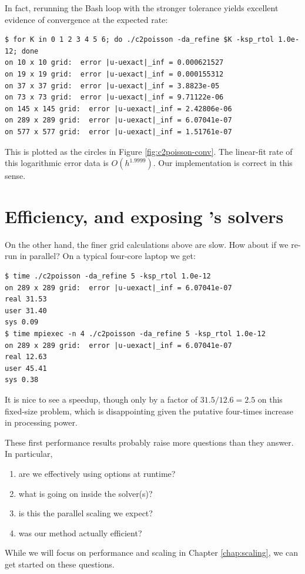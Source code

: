 In fact, rerunning the Bash loop with the stronger tolerance yields excellent evidence of convergence at the expected rate:
\begin{Verbatim}[fontsize=\small]
$ for K in 0 1 2 3 4 5 6; do ./c2poisson -da_refine $K -ksp_rtol 1.0e-12; done
on 10 x 10 grid:  error |u-uexact|_inf = 0.000621527
on 19 x 19 grid:  error |u-uexact|_inf = 0.000155312
on 37 x 37 grid:  error |u-uexact|_inf = 3.8823e-05
on 73 x 73 grid:  error |u-uexact|_inf = 9.71122e-06
on 145 x 145 grid:  error |u-uexact|_inf = 2.42806e-06
on 289 x 289 grid:  error |u-uexact|_inf = 6.07041e-07
on 577 x 577 grid:  error |u-uexact|_inf = 1.51761e-07
\end{Verbatim}
This is plotted as the circles in Figure \ref{fig:c2poisson-conv}.  The linear-fit rate of this logarithmic error data is $O(h^{1.9999})$.  Our implementation is correct in this sense.


\section{Efficiency, and exposing \PETSc's solvers}

On the other hand, the finer grid calculations above are slow.  How about if we re-run in parallel?  On a typical four-core laptop we get:
\begin{Verbatim}[fontsize=\small]
$ time ./c2poisson -da_refine 5 -ksp_rtol 1.0e-12
on 289 x 289 grid:  error |u-uexact|_inf = 6.07041e-07
real 31.53
user 31.40
sys 0.09
$ time mpiexec -n 4 ./c2poisson -da_refine 5 -ksp_rtol 1.0e-12
on 289 x 289 grid:  error |u-uexact|_inf = 6.07041e-07
real 12.63
user 45.41
sys 0.38
\end{Verbatim}
It is nice to see a speedup, though only by a factor of $31.5/12.6 = 2.5$ on this fixed-size problem, which is disappointing given the putative four-times increase in processing power.

These first performance results probably raise more questions than they answer.  In particular,
\renewcommand{\labelenumi}{\roman{enumi})}
\begin{enumerate}
\item are we effectively using \PETSc options at runtime?
\item what is going on inside the \PETSc solver(s)?
\item is this the parallel scaling we expect?
\item was our method actually efficient?
\end{enumerate}
While we will focus on performance and scaling in Chapter \ref{chap:scaling}, we can get started on these questions.

